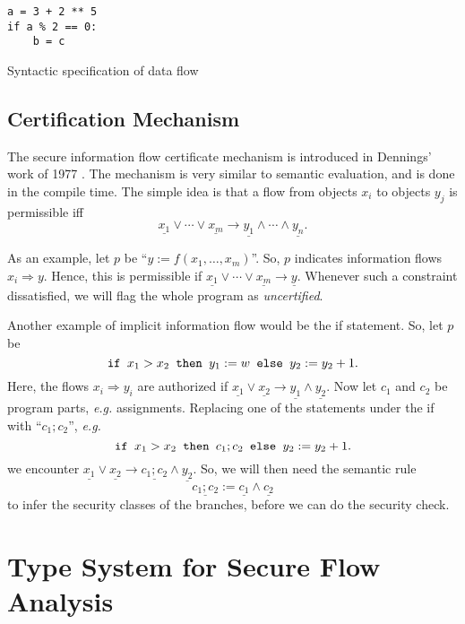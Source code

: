 \documentclass{llncs}
\begin{document}
\begin{listing}[ht]
\begin{verbatim}
a = 3 + 2 ** 5
if a % 2 == 0:
    b = c
\end{verbatim}
\caption{Syntactic specification of data flow}
\label{listing:syntactic-specification}
\end{listing}


\subsection{Certification Mechanism}

The secure information flow certificate mechanism is introduced in Dennings' work of 1977 \cite{Denning77}. The mechanism is very similar to semantic evaluation, and is done in the compile time. The simple idea is that a flow from objects $x_i$ to objects $y_j$ is permissible iff
\begin{equation}
    \underline{x_1} \vee \cdots \vee \underline{x_m} \rightarrow \underline{y_1} \wedge \cdots \wedge \underline{y_n}.
\end{equation}

As an example, let $p$ be ``$y := f(x_1, \dots, x_m)$''. So, $p$ indicates information flows $x_i \Rightarrow y$. Hence, this is permissible if $\underline{x_1} \vee \cdots \vee \underline{x_m} \rightarrow \underline{y}$. Whenever such a constraint dissatisfied, we will flag the whole program as \textit{uncertified}.

Another example of implicit information flow would be the if statement. So, let $p$ be 
\[
\mbox{\texttt{if }} x_1 > x_2 \mbox{\texttt{ then }} y_1 := w
\mbox{\texttt{ else }} y_2 := y_2 + 1.
\]
Here, the flows $x_i \Rightarrow y_i$ are authorized if $\underline{x_1} \vee \underline{x_2} \rightarrow \underline{y_1} \wedge \underline{y_2}$.
Now let $c_1$ and $c_2$ be program parts, \textit{e.g.} assignments. Replacing one of the statements under the if with ``$c_1; c_2$'', \textit{e.g.}
\[
\mbox{\texttt{if }} x_1 > x_2 \mbox{\texttt{ then }} c_1; c_2
\mbox{\texttt{ else }} y_2 := y_2 + 1.
\]
we encounter $\underline{x_1} \vee \underline{x_2} \rightarrow \underline{c_1; c_2} \wedge \underline{y_2}$. So, we will then need the semantic rule
\[
\underline{c_1; c_2} := \underline{c_1} \wedge \underline{c_2}
\]
to infer the security classes of the branches, before we can do the security check.

\section{Type System for Secure Flow Analysis}
\end{document}
